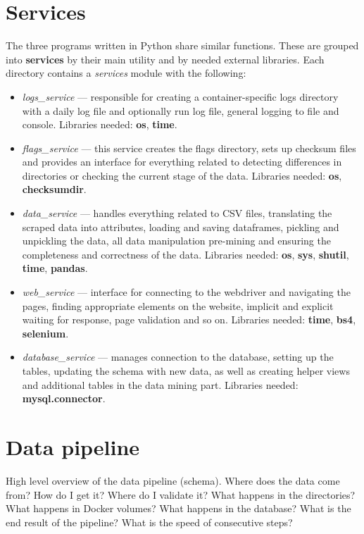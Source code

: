 \section{Services}
The three programs written in Python share similar functions. These are grouped into \textbf{services} by their main utility and by needed external libraries. Each directory contains a \textit{services} module with the following:
\begin{itemize}
\setlength\itemsep{0.3em}
\item \textit{logs\_service} --- responsible for creating a container-specific logs directory with a daily log file and optionally run log file, general logging to file and console. Libraries needed: \textbf{os}, \textbf{time}.
\item \textit{flags\_service} --- this service creates the flags directory, sets up checksum files and provides an interface for everything related to detecting differences in directories or checking the current stage of the data. Libraries needed: \textbf{os}, \textbf{checksumdir}.
\item \textit{data\_service} --- handles everything related to CSV files, translating the scraped data into attributes, loading and saving dataframes, pickling and unpickling the data, all data manipulation pre-mining and ensuring the completeness and correctness of the data. Libraries needed: \textbf{os}, \textbf{sys}, \textbf{shutil}, \textbf{time}, \textbf{pandas}.
\item \textit{web\_service} --- interface for connecting to the webdriver and navigating the pages, finding appropriate elements on the website, implicit and explicit waiting for response, page validation and so on. Libraries needed: \textbf{time}, \textbf{bs4}, \textbf{selenium}.
\item \textit{database\_service} --- manages connection to the database, setting up the tables, updating the schema with new data, as well as creating helper views and additional tables in the data mining part. Libraries needed: \textbf{mysql.connector}.
\end{itemize}

\section{Data pipeline}
High level overview of the data pipeline (schema).
Where does the data come from? How do I get it?
Where do I validate it? What happens in the directories?
What happens in Docker volumes? What happens in the database?
What is the end result of the pipeline?
What is the speed of consecutive steps?

